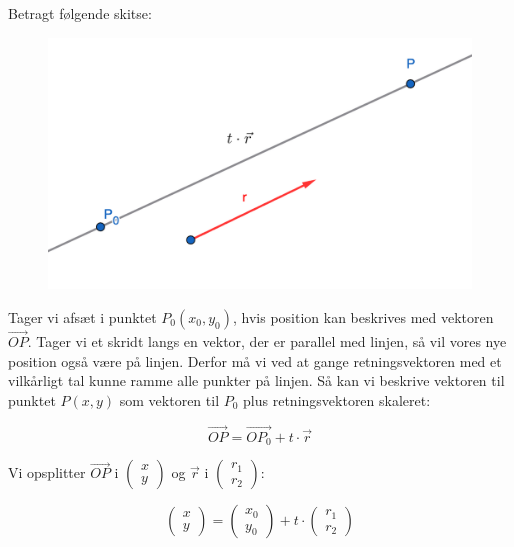\begin{proofw}
    Betragt følgende skitse:
    \begin{figure}[h]
        \centering
        \includegraphics[scale=0.4]{skitser/linje_parameter.png}
    \end{figure}

Tager vi afsæt i punktet $P_0(x_0,y_0)$, hvis position kan beskrives
med vektoren $\vec{OP}$. Tager vi et skridt langs en vektor, der er parallel med linjen,
så vil vores nye position også være på linjen.
Derfor må vi ved at gange retningsvektoren med et vilkårligt tal
kunne ramme alle punkter på linjen.
Så kan vi beskrive vektoren til punktet $P(x,y)$
som vektoren til $P_0$ plus retningsvektoren skaleret:

$$
\vec{OP}=\vec{OP_0}+t\cdot \vec{r}
$$

Vi opsplitter $\vec{OP}$ i $\begin{pmatrix}
    x \\ y
\end{pmatrix}$ og $\vec{r}$ i $\begin{pmatrix}
    r_1 \\ r_2
\end{pmatrix}$:

$$
\begin{pmatrix}
    x
    \\
    y
\end{pmatrix}
=\begin{pmatrix}
    x_0
    \\
    y_0
\end{pmatrix}
+
t \cdot \begin{pmatrix}
    r_1
    \\
    r_2
\end{pmatrix}
$$
\end{proofw}

